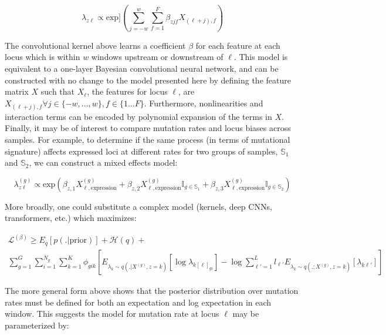 \documentclass{article}
\newcommand{\Lagr}{\mathcal{L}}
\begin{document}
\begin{equation}
\lambda_{z\ell} \propto \textrm{exp}] \left( \sum_{j=-w}^w \sum_{f=1}^F \beta_{zjf} X_{(\ell+j),f} \right)
\end{equation}

The convolutional kernel above learns a coefficient $\beta$ for each feature at each locus which is within $w$ windows upstream or downstream of $\ell$. This model is equivalent to a one-layer Bayesian convolutional neural network, and can be constructed with no change to the model presented here by defining the feature matrix $X$ such that $X_\ell$, the features for locus $\ell$, are $X_{(\ell+j),f}\forall j\in\{-w, ..., w\}, f \in \{1...F\}$. Furthermore, nonlinearities and interaction terms can be encoded by polynomial expansion of the terms in $X$. Finally, it may be of interest to compare mutation rates and locus biases across samples. For example, to determine if the same process (in terms of mutational signature) affects expressed loci at different rates for two groups of samples, $\mathbb{S}_1$ and $\mathbb{S}_2$, we can construct a mixed effects model:

\begin{equation}
\lambda^{(g)}_{z\ell} \propto \textrm{exp}\left( \beta_{z,1} X^{(g)}_{\ell,\textrm{expression}} + \beta_{z,2} X^{(g)}_{\ell,\textrm{expression}} \mathbb{I}_{g\in\mathbb{S}_1} + \beta_{z,3} X^{(g)}_{\ell,\textrm{expression}} \mathbb{I}_{g\in\mathbb{S}_2} \right)
\end{equation}

More broadly, one could substitute a complex model (kernels, deep CNNs, transformers, etc.) which maximizes:

\begin{equation}
\begin{split}
\Lagr^{(\beta)} \geq E_q [ p(. | \textrm{prior}) ] + \mathcal{H}(q) + \\
	\sum_{g=1}^G \sum_{i=1}^{N_g} \sum_{k=1}^K  \phi_{gik} \left[ E_{\lambda_k \sim q(.|X^{(g)}, z=k)} [ \log \lambda_{k[\ell]_{gi}}] - \log{\sum_{\ell'=1}^L l_{\ell'}  E_{\lambda_k \sim q(.;X^{(g)}, z=k)}[\lambda_{k\ell'}]} \right]
\end{split}
\end{equation}

The more general form above shows that the posterior distribution over mutation rates must be defined for both an expectation and log expectation in each window. This suggests the model for mutation rate at locus $\ell$ may be parameterized by:
\end{document}
